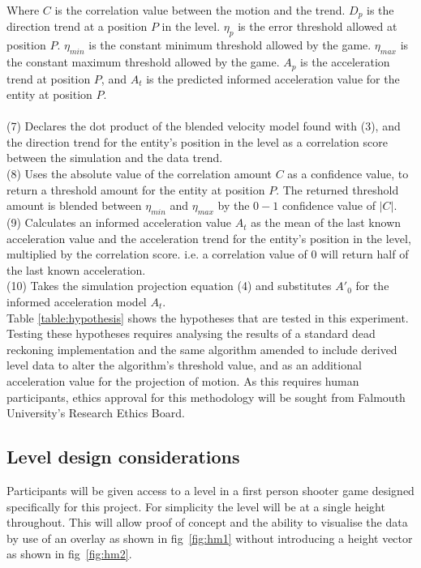 \documentclass[journal]{IEEEtran}
\begin{document}
Where $C$ is the correlation value between the motion and the trend. $D_p$ is the direction trend at a position $P$ in the level. $\eta_p$ is the error threshold allowed at position $P$. $\eta_{min}$ is the constant minimum threshold allowed by the game. $\eta_{max}$ is the constant maximum threshold allowed by the game. $A_p$ is the acceleration trend at position $P$, and $A_t$ is the predicted informed acceleration value for the entity at position $P$. \\
\\
(7) Declares the dot product of the blended velocity model found with (3), and the direction trend for the entity's position in the level as a correlation score between the simulation and the data trend. \\
(8) Uses the absolute value of the correlation amount $C$ as a confidence value, to return a threshold amount for the entity at position $P$. The returned threshold amount is blended between $\eta_{min}$ and $\eta_{max}$ by the $0 - 1$ confidence value of $|C|$. \\
(9) Calculates an informed acceleration value $A_t$ as the mean of the last known acceleration value and the acceleration trend for the entity's position in the level, multiplied by the correlation score. i.e. a correlation value of $0$ will return half of the last known acceleration. \\
(10) Takes the simulation projection equation (4) and substitutes $A'_0$ for the informed acceleration model $A_t$. \\ 

Table \ref{table:hypothesis} shows the hypotheses that are tested in this experiment. Testing these hypotheses requires analysing the results of a standard dead reckoning implementation and the same algorithm amended to include derived level data to alter the algorithm's threshold value, and as an additional acceleration value for the projection of motion. As this requires human participants, ethics approval for this methodology will be sought from Falmouth University’s Research Ethics Board.

\subsection{Level design considerations}

Participants will be given access to a level in a first person shooter game designed specifically for this project. For simplicity the level will be at a single height throughout. This will allow proof of concept and the ability to visualise the data by use of an overlay as shown in fig~\ref{fig:hm1} without introducing a height vector as shown in fig~\ref{fig:hm2}.
\end{document}
